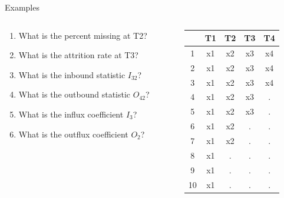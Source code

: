 \documentclass{beamer}\usepackage[]{graphicx}\usepackage[]{color}
\begin{document}
\begin{frame}{Examples}
  
  \begin{columns}
    \begin{column}{0.6\textwidth}
      
      \begin{enumerate}
        \item What is the percent missing at T2?
          \vb
        \item What is the attrition rate at T3?
          \vb
        \item What is the inbound statistic $I_{32}$?
          \vb
        \item What is the outbound statistic $O_{42}$?
          \vb
        \item What is the influx coefficient $I_3$?
          \vb
        \item What is the outflux coefficient $O_2$?
      \end{enumerate}
      
    \end{column}
    \begin{column}{0.4\textwidth}
      
\begin{table}[ht]
\centering
\begin{tabular}{ccccc}
  \toprule
 & T1 & T2 & T3 & T4 \\ 
  \midrule
1 & x1 & x2 & x3 & x4 \\ 
  2 & x1 & x2 & x3 & x4 \\ 
  3 & x1 & x2 & x3 & x4 \\ 
  4 & x1 & x2 & x3 & . \\ 
  5 & x1 & x2 & x3 & . \\ 
  6 & x1 & x2 & . & . \\ 
  7 & x1 & x2 & . & . \\ 
  8 & x1 & . & . & . \\ 
  9 & x1 & . & . & . \\ 
  10 & x1 & . & . & . \\ 
   \bottomrule
\end{tabular}
\end{table}


\end{column}
\end{columns}

\end{frame}
\end{document}
